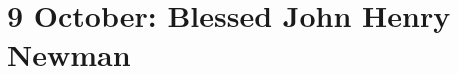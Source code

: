 {
\section{9 October: Blessed John Henry Newman}
\subtitle{ Class}
\subtitle{I \& II Vespers}
\medskip

\def\deusinadjutoriumsolemn{F}
\def\definevesperspropers{%
  
  \def\vrlinebreak{T}
}
\def\prepsalmtitlethree{\needspace{12\baselineskip}}
\def\definevesperspropersalt{
  \def\vrlinebreak{T}
  \let\oldthing=\maganttranslation
  \def\maganttranslation{\oldthing\needspace{10\baselineskip}}
}
\def\vesperspropersnote{At II Vespers:}
\def\vesperspropersaltnote{At I Vespers:}

\bigskip
\benedicamusdomino{}
}